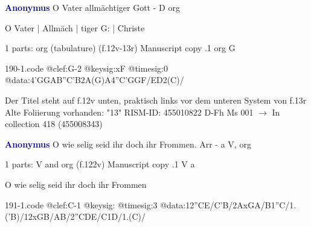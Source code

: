 \documentclass[twocolumn]{book}
\begin{document}
\newline \par \vspace{7pt} \textcolor{darkblue}{\textbf{Anonymus  }}
\newline O Vater allmächtiger Gott - D
\newline org
\newline \begin{itshape} O Vater | Allmäch | tiger G: | Christe\end{itshape} 
\newline \textcolor{darkblue}{}  1 parts: org (tabulature)  (f.12v-13r)
\newline Manuscript copy
.1  org  G  
\begin{filecontents*}{190-1.code}
@clef:G-2
@keysig:xF
@timesig:0
@data:4'GGAB''C'B2A(G)A4''C'GGF/ED2(C)/
\end{filecontents*}
\newline
%

\newline Der Titel steht auf f.12v unten, praktisch links vor dem unteren System von f.13r
\newline Alte Foliierung vorhanden: "13"
\newline RISM-ID: 455010822
\newline D-Fh  Ms 001
\newline $\rightarrow$ In collection 418 (455008343)
      
\newline \par \vspace{7pt} \textcolor{darkblue}{\textbf{Anonymus  }}
\newline O wie selig seid ihr doch ihr Frommen. Arr - a
\newline V, org
\newline \begin{itshape}\end{itshape} 
\newline \textcolor{darkblue}{}  1 parts: V and org  (f.122v)
\newline Manuscript copy
.1  V  a
\newline \begin{footnotesize} O wie selig seid ihr doch ihr Frommen \end{footnotesize}  
\begin{filecontents*}{191-1.code}
@clef:C-1
@keysig:
@timesig:3
@data:12''CE/C'B/2AxGA/B1''C/1.('B)/12xGB/AB/2''CDE/C1D/1.(C)/
\end{filecontents*}
\newline
%
\end{document}
